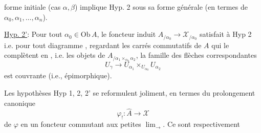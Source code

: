 
forme initiale (cas $\alpha,\beta$) implique Hyp. 2 sous sa forme générale (en termes de $\alpha_0,\alpha_1,\ldots,\alpha_n$).

\uline{Hyp. 2'}: Pour tout $\alpha_0\in\mathrm{Ob}\,A$, le foncteur induit $A_{/\alpha_0}\longrightarrow\mathcal X_{/\alpha_0}$ satisfait à Hyp 2 i.e. pour tout diagramme
, regardant les carrés commutatifs de $A$ qui le complètent en
, i.e. les objets de $A_{/\alpha_1\times_{\alpha_0}\alpha_2}$, la famille des flèches correspondantes
\[U_\gamma\longrightarrow U_{\alpha_1}\times_{U_{\alpha_0}}U_{\alpha_2}\]
est couvrante (i.e., épimorphique).

Les hypothèses Hyp 1, 2, 2' se reformulent joliment, en termes du prolongement canonique
\[\varphi_!:\widehat A\longrightarrow\mathcal X\]
de $\varphi$ en un foncteur  commutant  aux petites $\lim_{\longrightarrow}$. Ce sont respectivement
